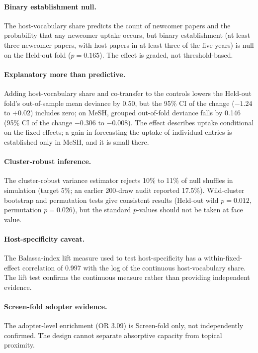 \documentclass[11pt,letterpaper]{article}
\begin{document}
\paragraph{Binary establishment null.} The host-vocabulary share predicts the count of newcomer papers and the
probability that any newcomer uptake occurs, but binary establishment (at least three newcomer papers, with host papers in at least
three of the five years) is null on the Held-out fold ($p = 0.165$). The effect is graded, not threshold-based.

\paragraph{Explanatory more than predictive.} Adding host-vocabulary share and co-transfer to the controls lowers
the Held-out fold's out-of-sample mean deviance by 0.50, but the 95\% CI of the change ($-1.24$ to $+0.02$)
includes zero; on MeSH, grouped out-of-fold deviance falls by 0.146 (95\% CI of the change $-0.306$ to
$-0.008$). The effect describes uptake conditional on the fixed effects; a gain in forecasting the uptake of
individual entries is established only in MeSH, and it is small there.

\paragraph{Cluster-robust inference.} The cluster-robust variance estimator rejects 10\% to 11\% of null
shuffles in simulation (target 5\%; an earlier 200-draw audit reported 17.5\%). Wild-cluster bootstrap and permutation tests give consistent results
(Held-out wild $p = 0.012$, permutation $p = 0.026$), but the standard $p$-values should not be taken at
face value.

\paragraph{Host-specificity caveat.} The Balassa-index lift measure used to test host-specificity has a
within-fixed-effect correlation of 0.997 with the log of the continuous host-vocabulary share. The lift test
confirms the continuous measure rather than providing independent evidence.

\paragraph{Screen-fold adopter evidence.} The adopter-level enrichment (OR 3.09) is Screen-fold only, not
independently confirmed. The design cannot separate absorptive capacity from topical proximity.
\end{document}
